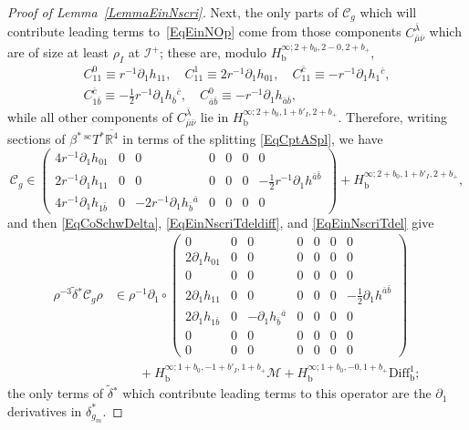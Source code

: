 \documentclass[reqno,11pt,letterpaper]{amsart}
\numberwithin{equation}{section}
\numberwithin{figure}{section}
\theoremstyle{definition}
\theoremstyle{remark}
\newcommand{\mc}{\mathcal}
\newcommand{\cM}{\mc M}
\newcommand{\ms}{\mathscr}
\newcommand{\sC}{\ms C}
\newcommand{\scri}{\ms I}
\newcommand{\R}{\mathbb{R}}
\newcommand{\ol}{\overline}
\newcommand{\pa}{\partial}
\newcommand{\wt}{\widetilde}
\newcommand{\bop}{{\mathrm{b}}}
\newcommand{\scl}{{\mathrm{sc}}}
\newcommand{\Diff}{\mathrm{Diff}}
\newcommand{\Diffb}{\Diff_\bop}
\newcommand{\Tsc}{{}^{\scl}T}
\newcommand{\half}{\tfrac{1}{2}}
\newcommand{\Hb}{H_{\bop}}
\newcommand{\tdel}{\wt{\delta}{}}
\newcommand{\usref}[1]{{\upshape\ref{#1}}}
\begin{document}
\begin{proof}[Proof of Lemma~\usref{LemmaEinNscri}]
  Next, the only parts of $\sC_g$ which will contribute leading terms to~\eqref{EqEinNOp} come from those components $C^{\bar\lambda}_{\bar\mu\bar\nu}$ which are of size at least $\rho_I$ at $\scri^+$; these are, modulo $\Hb^{\infty;2+b_0,2-0,2+b_+}$,
  \begin{equation}
  \label{EqEinNscriCTensor}
  \begin{gathered}
    C^0_{1 1} \equiv r^{-1}\pa_1 h_{1 1},\quad
    C^1_{1 1} \equiv 2 r^{-1}\pa_1 h_{0 1},\quad
    C^{\bar c}_{1 1} \equiv -r^{-1}\pa_1 h_1{}^{\bar c}, \\
    C^{\bar c}_{1\bar b} \equiv -\half r^{-1}\pa_1 h_{\bar b}{}^{\bar c}, \quad
    C^0_{\bar a\bar b} \equiv -r^{-1}\pa_1 h_{\bar a\bar b},
  \end{gathered}
  \end{equation}
  while all other components of $C^{\bar\lambda}_{\bar\mu\bar\nu}$ lie in $\Hb^{\infty;2+b_0,1+b'_I,2+b_+}$. Therefore, writing sections of $\beta^*\,\Tsc^*\ol{\R^4}$ in terms of the splitting \eqref{EqCptASpl}, we have
  \[
    \sC_g \in
      \begin{pmatrix}
        4 r^{-1}\pa_1 h_{0 1} & 0 & 0 & 0 & 0 & 0 & 0 \\
        2 r^{-1}\pa_1 h_{1 1} & 0 & 0 & 0 & 0 & 0 & -\half r^{-1}\pa_1 h^{\bar a\bar b} \\
        4 r^{-1}\pa_1 h_{1\bar b} & 0 & -2 r^{-1}\pa_1 h_{\bar b}{}^{\bar a} & 0 & 0 & 0 & 0
      \end{pmatrix}
      + \Hb^{\infty;2+b_0,1+b'_I,2+b_+},
  \]
  and then \eqref{EqCoSchwDelta}, \eqref{EqEinNscriTdeldiff}, and \eqref{EqEinNscriTdel} give
  \begin{align}
  \label{EqEinNscrisC}
    \rho^{-3}\tdel^*\sC_g\rho &\in
      \rho^{-1}\pa_1\circ
      \begin{pmatrix}
        0 & 0 & 0 & 0 & 0 & 0 & 0 \\
        2\pa_1 h_{0 1} & 0 & 0 & 0 & 0 & 0 & 0 \\
        0 & 0 & 0 & 0 & 0 & 0 & 0 \\
        2\pa_1 h_{1 1} & 0 & 0 & 0 & 0 & 0 & -\half\pa_1 h^{\bar a\bar b} \\
        2\pa_1 h_{1\bar b} & 0 & -\pa_1 h_{\bar b}{}^{\bar a} & 0 & 0 & 0 & 0 \\
        0 & 0 & 0 & 0 & 0 & 0 & 0 \\
        0 & 0 & 0 & 0 & 0 & 0 & 0
      \end{pmatrix} \\
      &\qquad + \Hb^{\infty;1+b_0,-1+b'_I,1+b_+}\cM + \Hb^{\infty;1+b_0,-0,1+b_+}\Diffb^1; \nonumber
  \end{align}
  the only terms of $\tdel^*$ which contribute leading terms to this operator are the $\pa_1$ derivatives in $\delta_{g_m}^*$.


\end{proof}
\end{document}

